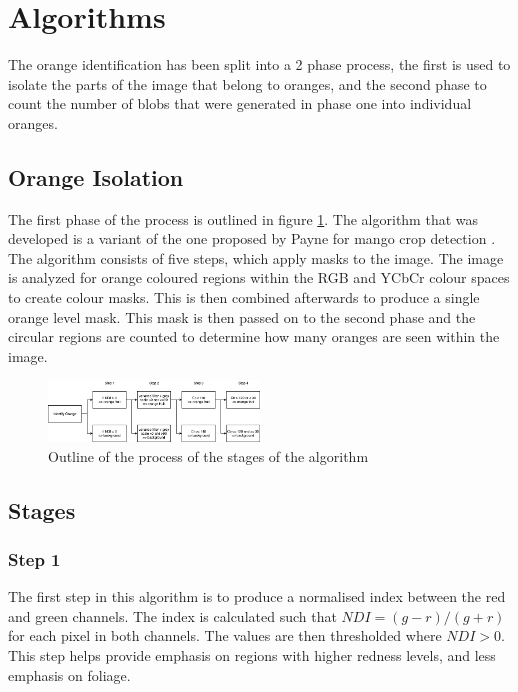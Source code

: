 \documentclass[conference]{IEEEtran}
\begin{document}
\section{Algorithms}

The orange identification has been split into a 2 phase process, the first is used to isolate the parts of the image that belong to oranges, and the second phase to count the number of blobs that were generated in phase one into individual oranges.

\subsection{Orange Isolation}

The first phase of the process is outlined in figure \ref{fig:algoOverview}. The algorithm that was developed is a variant of the one proposed by Payne for mango crop detection  \cite{payne_estimation_2013}. The algorithm consists of five steps, which apply masks to the image. The image is analyzed for orange coloured regions within the RGB and YCbCr colour spaces to create colour masks. This is then combined afterwards to produce a single orange level mask.  This mask is then passed on to the second phase and the circular regions are counted to determine how many oranges are seen within the image.

\begin{figure}[H]
\centerline{\includegraphics[width=0.5\textwidth]{algo_stages}}
\caption{Outline of the process of the stages of the algorithm}
\label{fig:algoOverview}
\end{figure}

\subsection{Stages}

\subsubsection{Step 1}
The first step in this algorithm is to produce a normalised index between the red and green channels. The index is calculated such that $NDI = (g - r) / (g + r)$ for each pixel in both channels. The values are then thresholded where $NDI > 0$. This step helps provide emphasis on regions with higher redness levels, and less emphasis on foliage.
\end{document}
